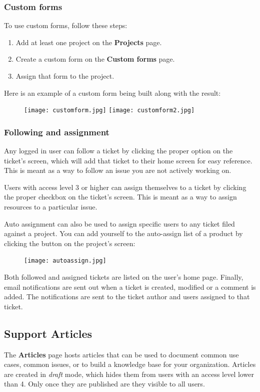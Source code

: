 \documentclass[11pt]{article}
\begin{document}
\subsubsection{Custom forms}
To use custom forms, follow these steps:

\begin{enumerate}
\item Add at least one project on the \textbf{Projects} page.
\item Create a custom form on the \textbf{Custom forms} page.
\item Assign that form to the project.
\end{enumerate}

Here is an example of a custom form being built along with the result:

\begin{figure}[h]
\texttt{[image: customform.jpg]}
\texttt{[image: customform2.jpg]}
\end{figure}

\subsubsection{Following and assignment}
Any logged in user can follow a ticket by clicking the proper option on the ticket's screen, which will add that ticket to their home screen for easy reference. This is meant as a way to follow an issue you are not actively working on.

Users with access level 3 or higher can assign themselves to a ticket by clicking the proper checkbox on the ticket's screen. This is meant as a way to assign resources to a particular issue.

Auto assignment can also be used to assign specific users to any ticket filed against a project. You can add yourself to the auto-assign list of a product by clicking the button on the project's screen:

\begin{figure}[h]
\texttt{[image: autoassign.jpg]}
\end{figure}

Both followed and assigned tickets are listed on the user's home page. Finally, email notifications are sent out when a ticket is created, modified or a comment is added. The notifications are sent to the ticket author and users assigned to that ticket.

\subsection{Support Articles}
The \textbf{Articles} page hosts articles that can be used to document common use cases, common issues, or to build a knowledge base for your organization. Articles are created in \textit{draft} mode, which hides them from users with an access level lower than 4. Only once they are published are they visible to all users.
\end{document}
